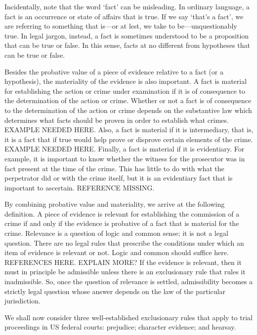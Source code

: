 \documentclass[10pt]{article}
\begin{document}
Incidentally, note that the word `fact' can be misleading. In ordinary language, a fact is an occurrence or state of affairs that is true. If we say `that's a fact', we are referring to 
something that is---or at lest, we take to be---unquestionably true. In legal jargon, instead, a fact is sometimes understood to be a proposition 
that can be true or false. In this sense, facts at no different from hypotheses that can be true or false.


Besides the probative value of a piece of evidence relative to a fact (or a hypothesis), the materiality of the evidence 
is also important. A fact is material for establishing the action or crime under examination if it is of consequence to the determination of the action or crime. Whether or not a fact is of consequence to the determination of the action or crime depends on the substantive law which determines what facts should be proven in order to establish what crimes. EXAMPLE NEEDED HERE. Also, a fact is material if it is intermediary, that is, it is a fact that if true would help prove or disprove certain elements of the crime. EXAMPLE NEEDED HERE. Finally, a fact is material if it is evidentiary. For example, it is important to know whether the witness for the prosecutor was in fact present at the time of the crime. This has little to do with what the perpetrator did or with the crime itself, but it is an evidentiary fact that is important to ascertain.  
REFERENCE MISSING. 

By combining probative value and materiality, we arrive at the following definition. A piece of evidence is relevant for establishing the commission of a 
crime if and only if the evidence is probative of a fact that is material for the crime. Relevance is a question of logic and common sense; it is not a legal question. 
There are no legal rules that prescribe the conditions under which an item of evidence is relevant or not. Logic and common should suffice here. REFERENCES HERE. EXPLAIN MORE?
If the evidence is relevant, then it must in principle be admissible unless there is an exclusionary rule that rules it inadmissible. 
So, once the question of relevance is settled, admissibility becomes a strictly legal question whose answer depends 
on the law of the particular jurisdiction. 

We shall now consider three well-established exclusionary rules 
that apply to trial proceedings in US federal courts: 
prejudice; character evidence; and hearsay. 
\end{document}
